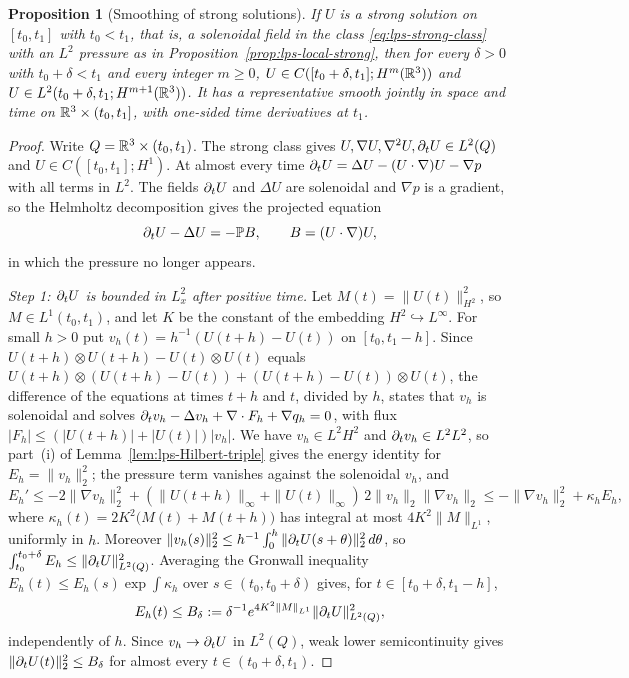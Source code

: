 \documentclass[11pt,letterpaper]{article}
\numberwithin{equation}{section}
\theoremstyle{plain}
\newtheorem{proposition}[theorem]{Proposition}
\theoremstyle{definition}
\theoremstyle{remark}
\begin{document}
\begin{proposition}[Smoothing of strong solutions]\label{prop:lps-smoothing}
If $U$ is a strong solution on $[t_0,t_1]$ with $t_0<t_1$, that is, a solenoidal
field in the class \eqref{eq:lps-strong-class} with an $L^2$ pressure as in
Proposition~\ref{prop:lps-local-strong}, then for every $\delta>0$ with
$t_0+\delta<t_1$ and every integer $m\ge0$,
$U\in C([t_0+\delta,t_1];H^m(\mathbb{R}^3))$ and
$U\in L^2(t_0+\delta,t_1;H^{m+1}(\mathbb{R}^3))$.
It has a representative smooth jointly in space and time on
$\mathbb{R}^3\times(t_0,t_1]$, with one-sided time derivatives at $t_1$.
\end{proposition}

\begin{proof}
Write $Q=\mathbb{R}^3\times(t_0,t_1)$. The strong class gives
$U,\nabla U,\nabla^2U,\partial_t U\in L^2(Q)$ and $U\in C([t_0,t_1];H^1)$. At almost
every time $\partial_t U=\Delta U-(U\cdot\nabla)U-\nabla p$ with all terms in $L^2$.
The fields $\partial_t U$ and $\Delta U$ are solenoidal and $\nabla p$ is a gradient,
so the Helmholtz decomposition gives the projected equation
\begin{equation}\label{eq:lps-projected}
\partial_t U-\Delta U=-\mathbb{P} B,\qquad B=(U\cdot\nabla)U,
\end{equation}
in which the pressure no longer appears.

\emph{Step 1: $\partial_t U$ is bounded in $L^2_x$ after positive time.}
Let $M(t)=\|U(t)\|_{H^2}^2$, so $M\in L^1(t_0,t_1)$, and let $K$ be the
constant of the embedding $H^2\hookrightarrow L^\infty$. For small $h>0$ put
$v_h(t)=h^{-1}(U(t+h)-U(t))$ on $[t_0,t_1-h]$. Since
$U(t+h)\otimes U(t+h)-U(t)\otimes U(t)$ equals
$U(t+h)\otimes(U(t+h)-U(t))+(U(t+h)-U(t))\otimes U(t)$, the difference of
the equations at times $t+h$ and $t$, divided by $h$, states that $v_h$ is
solenoidal and solves $\partial_t v_h-\Delta v_h+\nabla\cdot F_h+\nabla q_h=0$, with
flux $|F_h|\le(|U(t+h)|+|U(t)|)|v_h|$. We have $v_h\in L^2H^2$ and
$\partial_t v_h\in L^2L^2$, so part~(i) of Lemma~\ref{lem:lps-Hilbert-triple}
gives the energy identity for $E_h=\|v_h\|_2^2$; the pressure term vanishes
against the solenoidal $v_h$, and
\[
E_h'\le-2\|\nabla v_h\|_2^2
 +(\|U(t+h)\|_\infty+\|U(t)\|_\infty)\,2\|v_h\|_2\|\nabla v_h\|_2
\le-\|\nabla v_h\|_2^2+\kappa_hE_h,
\]
where $\kappa_h(t)=2K^2\bigl(M(t)+M(t+h)\bigr)$ has integral at most
$4K^2\|M\|_{L^1}$, uniformly in $h$. Moreover
$\|v_h(s)\|_2^2\le h^{-1}\int_0^h\|\partial_t U(s+\theta)\|_2^2\,d\theta$, so
$\int_{t_0}^{t_0+\delta}E_h\le\|\partial_t U\|_{L^2(Q)}^2$. Averaging the
Gronwall inequality $E_h(t)\le E_h(s)\exp\int\kappa_h$ over
$s\in(t_0,t_0+\delta)$ gives, for $t\in[t_0+\delta,t_1-h]$,
\[
E_h(t)\le B_\delta:=\delta^{-1}e^{4K^2\|M\|_{L^1}}\|\partial_t U\|_{L^2(Q)}^2 ,
\]
independently of $h$. Since $v_h\to\partial_t U$ in $L^2(Q)$, weak lower
semicontinuity gives $\|\partial_t U(t)\|_2^2\le B_\delta$ for almost every
$t\in(t_0+\delta,t_1)$.


\end{proof}
\end{document}
